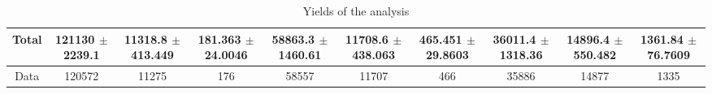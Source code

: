 \documentclass[10pt]{article}
\begin{document}
\begin{table}[htbp]
\begin{center}
\begin{tabular}{|c|c|c|c|c|c|c|c|c|c|}
\hline 
  Total  & \num[round-mode=figures,round-precision=3]{121130} $\pm$ \num[round-mode=figures,round-precision=3]{2239.1} & \num[round-mode=figures,round-precision=3]{11318.8} $\pm$ \num[round-mode=figures,round-precision=3]{413.449} & \num[round-mode=figures,round-precision=3]{181.363} $\pm$ \num[round-mode=figures,round-precision=3]{24.0046} & \num[round-mode=figures,round-precision=3]{58863.3} $\pm$ \num[round-mode=figures,round-precision=3]{1460.61} & \num[round-mode=figures,round-precision=3]{11708.6} $\pm$ \num[round-mode=figures,round-precision=3]{438.063} & \num[round-mode=figures,round-precision=3]{465.451} $\pm$ \num[round-mode=figures,round-precision=3]{29.8603} & \num[round-mode=figures,round-precision=3]{36011.4} $\pm$ \num[round-mode=figures,round-precision=3]{1318.36} & \num[round-mode=figures,round-precision=3]{14896.4} $\pm$ \num[round-mode=figures,round-precision=3]{550.482} & \num[round-mode=figures,round-precision=3]{1361.84} $\pm$ \num[round-mode=figures,round-precision=3]{76.7609} \\ 
\hline 
  Data   & 120572 & 11275 & 176 & 58557 & 11707 & 466 & 35886 & 14877 & 1335 \\ 
\hline 
\end{tabular} 
\caption{Yields of the analysis} 
\end{center} 
\end{table} 
\end{document}
